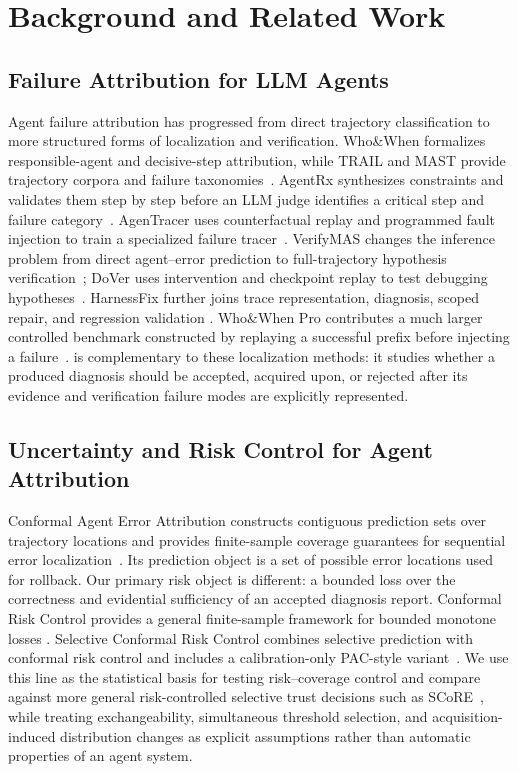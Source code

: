 \section{Background and Related Work}
\label{sec:related-work}

\subsection{Failure Attribution for LLM Agents}

Agent failure attribution has progressed from direct trajectory classification
to more structured forms of localization and verification. Who\&When formalizes
responsible-agent and decisive-step attribution, while TRAIL and MAST provide
trajectory corpora and failure taxonomies~\cite{zhang2025whowhen,deshpande2025trail,cemri2025mast}.
AgentRx synthesizes
constraints and validates them step by step before an LLM judge identifies a
critical step and failure category~\cite{barke2026agentrx}. AgenTracer uses
counterfactual replay and programmed fault injection to train a specialized
failure tracer~\cite{zhang2025agentracer}. VerifyMAS changes the inference
problem from direct agent--error prediction to full-trajectory hypothesis
verification~\cite{qiao2026verifymas}; DoVer uses intervention and checkpoint
replay to test debugging hypotheses~\cite{ma2026dover}. HarnessFix further joins
trace representation, diagnosis, scoped repair, and regression validation
\cite{chen2026harnessfix}. Who\&When Pro contributes a much larger
controlled benchmark constructed by replaying a successful prefix before
injecting a failure~\cite{liu2026whowhenpro}. \method is complementary to
these localization methods: it studies whether a produced diagnosis should be
accepted, acquired upon, or rejected after its evidence and verification
failure modes are explicitly represented.

\subsection{Uncertainty and Risk Control for Agent Attribution}

Conformal Agent Error Attribution constructs contiguous prediction sets over
trajectory locations and provides finite-sample coverage guarantees for
sequential error localization~\cite{feng2026conformalagent}. Its prediction
object is a set of possible error locations used for rollback. Our primary
risk object is different: a bounded loss over the correctness and evidential
sufficiency of an accepted diagnosis report. Conformal Risk Control provides a
general finite-sample framework for bounded monotone losses
\cite{angelopoulos2024crc}. Selective Conformal Risk Control
combines selective prediction with conformal risk control and includes a
calibration-only PAC-style variant~\cite{xu2025scrc}. We use this line as the
statistical basis for testing risk--coverage control and compare against more
general risk-controlled selective trust decisions such as
SCoRE~\cite{bai2026score}, while treating
exchangeability, simultaneous threshold selection, and acquisition-induced
distribution changes as explicit assumptions rather than automatic
properties of an agent system.

